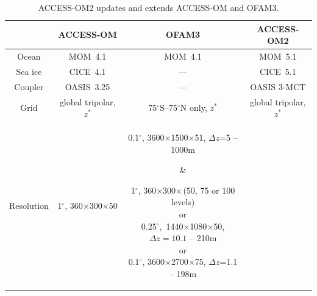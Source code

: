 \documentclass[11pt]{article}
\begin{document}
\begin{table}%
\caption{ACCESS-OM2 updates and extends ACCESS-OM and OFAM3.}
\begin{center}
\begin{tabular}{|c|c|c|c|}
\hline
& \textbf{ACCESS-OM} & \textbf{OFAM3} & \textbf{ACCESS-OM2}\\
\hline
Ocean & MOM~4.1 & MOM~4.1 & MOM~5.1\\
Sea ice & CICE~4.1 & --- & CICE~5.1\\
Coupler & OASIS~3.25 & --- & OASIS 3-MCT\\
Grid & global tripolar, $z^*$ & 75$^\circ$S--75$^\circ$N only, $z^*$ & global tripolar, $z^*$\\
Resolution & 
1$^\circ$, 360$\times$300$\times$50 & 
\parbox[][][c]{22ex}{%
0.1$^\circ$, 3600$\times$1500$\times$51, $\Delta z$=5 -- 1000m 
} &
\parbox[][][c]{22ex}{%
1$^\circ$, 360$\times$300$\times\\$(50, 75 or 100 levels)\\
or\\0.25$^\circ$,~1440$\times$1080$\times$50,\\$\Delta z=10.1$ -- 210m\\
or\\0.1$^\circ$, 3600$\times$2700$\times$75, $\Delta z$=1.1 -- 198m\\[-1ex]}\\
\hline
\end{tabular}
\end{center}
\label{T:access-om-ofam3-access-om2}
\end{table}
\end{document}
